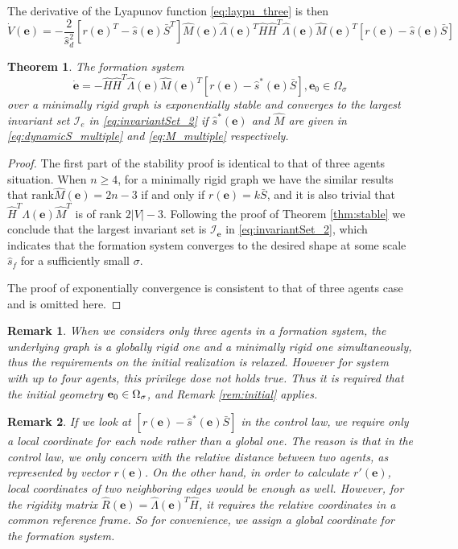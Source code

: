 \documentclass[times]{rncauth}
\newcommand{\be}{\ensuremath \mathbf{e}}
\newtheorem{thm}{Theorem}[section]
\newtheorem{rem}{Remark}[section]
\begin{document}
The derivative of the Lyapunov function \eqref{eq:laypu_three} is
then
\begin{equation}\label{eq:dvde_multi}
\dot{V}(\mathbf{e})=-\frac{2}{\hat{s}_d^2}[r(\mathbf{e})^T-\hat{s}(\mathbf{e})\bar{S}^T]
\hat{M}(\mathbf{e})\hat{\Lambda}(\mathbf{e})^T\hat{H} \hat{H}
^T\hat{\Lambda}(\mathbf{e})\hat{M}(\mathbf{e})^T[r(\mathbf{e})-\hat{s}(\mathbf{e})\bar{S}]
\end{equation}

\begin{thm}\label{thm:stable_multi}
The formation system
\begin{equation}\label{eq:myopt_multi} \dot{\mathbf{e}}=-\hat{H}\hat{H}^T\hat{\Lambda}(\mathbf{e})
\hat{M}(\mathbf{e})^T[r(\mathbf{e})-\hat{s}^*(\mathbf{e})\bar{S}],
\mathbf{e}_0\in \Omega_\sigma
\end{equation}
over a minimally rigid graph is exponentially stable and converges
to the largest invariant set $\mathcal{I}_e$ in
\eqref{eq:invariantSet_2} if $\hat{s}^*(\mathbf{e})$ and $\hat{M}$
are given in \eqref{eq:dynamicS_multiple} and \eqref{eq:M_multiple}
respectively.
\end{thm}
\begin{proof}
The first part of the stability proof is identical to that of three
agents situation. When $n\geq 4$, for a minimally rigid graph we
have the similar results that $\text{rank} \hat{M}(\mathbf{e})=2n-3$
if and only if $r(\mathbf{e})=k\bar{S}$, and it is also trivial that
$\hat{H}^T\Lambda(\mathbf{e})\hat{M}^T$ is of rank $2|V|-3$.
Following the proof of Theorem \ref{thm:stable} we conclude that the
largest invariant set is $\mathcal{I}_{\mathbf{e}}$ in
\eqref{eq:invariantSet_2}, which indicates that the formation system
converges to the desired shape at some scale $\hat{s}_f$ for a
sufficiently small $\sigma$.

The proof of exponentially convergence is consistent to that of
three agents case and is omitted here.
\end{proof}
\begin{rem}
When we considers only three agents in a formation system, the
underlying graph is a globally rigid one and a minimally rigid one
simultaneously, thus the requirements on the initial realization is
relaxed. However for system with up to four agents, this privilege
dose not holds true. Thus it is required that the initial geometry
$\be_0\in\Omega_\sigma$, and Remark \ref{rem:initial} applies.
\end{rem}
\begin{rem}
  If we look at $[r(\mathbf{e})-\hat{s}^*(\mathbf{e})\bar{S}]$ in the control law,
  we require only a local
  coordinate for each node rather than a global one.
  The reason is that in the control law, we only concern with the
  relative distance between two agents, as represented by vector
  $r(\mathbf{e})$. On the other hand, in order to calculate $r'(\mathbf{e})$,
  local coordinates of two neighboring edges would be enough as well.
  However, for the rigidity matrix $\hat{R}(\mathbf{e})=\hat{\Lambda}(\mathbf{e})^T\hat{H}$,
  it requires the relative coordinates in a common reference frame. So for convenience,
  we assign a global coordinate for the formation system.
\end{rem}
\end{document}
